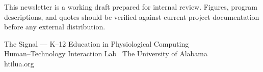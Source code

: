 \documentclass[10pt,letterpaper]{article}
\newcommand{\hairline}{\noindent{\color{htilrule}\rule{\linewidth}{0.4pt}}\par}
\begin{document}
\vspace{8pt}\hairline\vspace{4pt}
\noindent
\begin{minipage}[t]{0.60\linewidth}
  {\color{htilgray}\small This newsletter is a working draft prepared for internal review. Figures, program descriptions, and quotes should be verified against current project documentation before any external distribution.\par}
\end{minipage}%
\hfill
\begin{minipage}[t]{0.37\linewidth}\raggedleft
  {\color{htilgray}\fontsize{7.6}{10}\selectfont The Signal --- K--12 Education in Physiological Computing\\ Human--Technology Interaction Lab \textperiodcentered\ The University of Alabama\\ \textcolor{htilred}{htilua.org}\par}
\end{minipage}
\end{document}

